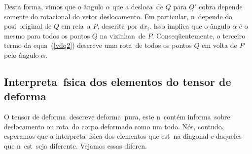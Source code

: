 Desta forma, vimos que o \^angulo $\alpha$ que a desloca\cao\ de $Q$
para $Q'$ cobra depende somente do rotacional do vetor deslocamento. Em
particular, n\ao\ depende da posi\cao\ original de $Q$ em rela\cao\ a
$P$, descrita por $dx_i$. Isso implica que o \^angulo $\alpha$ \'e o
mesmo para todos os pontos $Q$ na vizinhan\ca\ de $P$.
Conseq\"uentemente, o terceiro termo da equa\cao\ (\ref{vdq2}) descreve
uma rota\cao\ de todos os pontos $Q$ em volta de $P$ pelo \^angulo
$\alpha$.

\subsection{Interpreta\cao\ f\ih sica dos elementos do %
tensor de deforma\cao}

O tensor de deforma\cao\ descreve deforma\cao\ pura, este
n\ao\ cont\'em informa\cao\ sobre deslocamento ou
rota\cao\ do corpo deformado como um todo. N\'os, contudo, esperamos
que a interpreta\cao\ f\ih sica dos elementos que
est\ao\ na diagonal e daqueles que n\ao\ est\ao\ seja
diferente. Vejamos essas diferen\cas.

